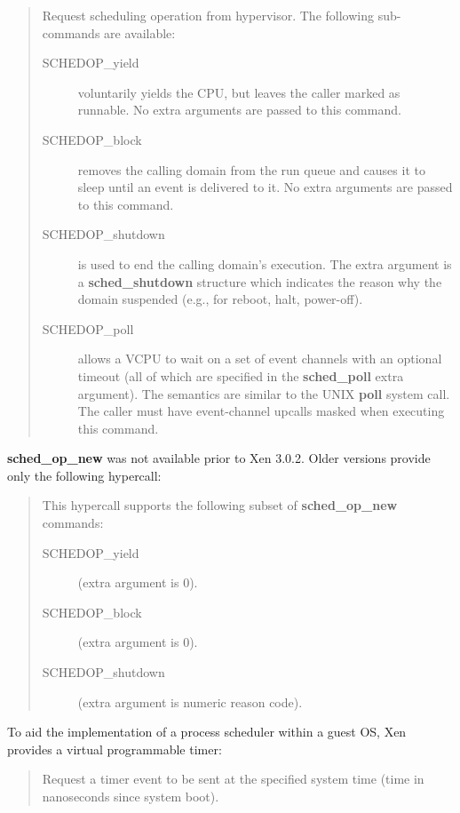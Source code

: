\documentclass[11pt,twoside,final,openright,a4paper]{report}
\newcommand{\hypercall}[1]{\vspace{2mm}{\sf #1}}
\begin{document}
\begin{quote} 
\hypercall{sched\_op\_new(int cmd, void *extra\_args)}

Request scheduling operation from hypervisor. The following
sub-commands are available:

\begin{description}
\item[SCHEDOP\_yield] voluntarily yields the CPU, but leaves the
caller marked as runnable. No extra arguments are passed to this
command. 
\item[SCHEDOP\_block] removes the calling domain from the run queue
and causes it to sleep until an event is delivered to it. No extra 
arguments are passed to this command. 
\item[SCHEDOP\_shutdown] is used to end the calling domain's
execution. The extra argument is a {\bf sched\_shutdown} structure
which indicates the reason why the domain suspended (e.g., for reboot,
halt, power-off).
\item[SCHEDOP\_poll] allows a VCPU to wait on a set of event channels
with an optional timeout (all of which are specified in the {\bf
sched\_poll} extra argument). The semantics are similar to the UNIX
{\bf poll} system call. The caller must have event-channel upcalls
masked when executing this command.
\end{description}
\end{quote} 

{\bf sched\_op\_new}  was not available prior to Xen 3.0.2. Older versions
provide only the following hypercall:

\begin{quote} 
\hypercall{sched\_op(int cmd, unsigned long extra\_arg)}

This hypercall supports the following subset of {\bf sched\_op\_new} commands:

\begin{description}
\item[SCHEDOP\_yield] (extra argument is 0).
\item[SCHEDOP\_block] (extra argument is 0).
\item[SCHEDOP\_shutdown] (extra argument is numeric reason code).
\end{description}
\end{quote}

To aid the implementation of a process scheduler within a guest OS,
Xen provides a virtual programmable timer:

\begin{quote}
\hypercall{set\_timer\_op(uint64\_t timeout)} 

Request a timer event to be sent at the specified system time (time 
in nanoseconds since system boot).

\end{quote} 
\end{document}
